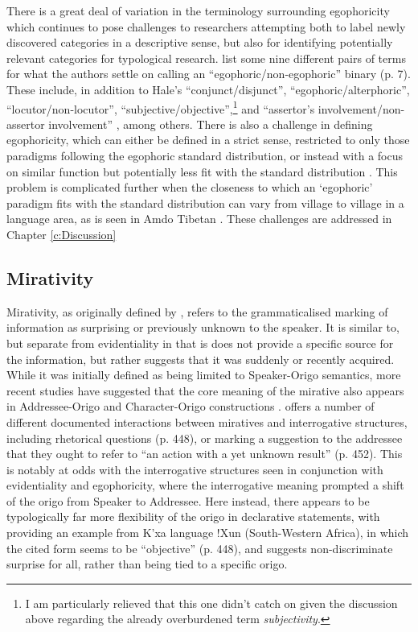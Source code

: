 There is a great deal of variation in the terminology surrounding egophoricity which continues to pose challenges to researchers attempting both to label newly discovered categories in a descriptive sense, but also for identifying potentially relevant categories for typological research.  list some nine different pairs of terms for what the authors settle on calling an ``egophoric/non-egophoric'' binary (p. 7). These include, in addition to Hale's ``conjunct/disjunct'', ``egophoric/alterphoric'', ``locutor/non-locutor'', ``subjective/objective'',\footnote{I am particularly relieved that this one didn't catch on given the discussion above regarding the already overburdened term \textit{subjectivity}.} and ``assertor's involvement/non-assertor involvement'' \cite[8]{EgoIntro}, among others. There is also a challenge in defining egophoricity, which can either be defined in a strict sense, restricted to only those paradigms following the egophoric standard distribution, or instead with a focus on similar function but potentially less fit with the standard distribution \cite{EgoIntro}. This problem is complicated further when the closeness to which an `egophoric' paradigm fits with the standard distribution can vary from village to village in a language area, as is seen in Amdo Tibetan \cite{Tribur2019}. These challenges are addressed in Chapter \ref{c:Discussion} 

\subsection{Mirativity}\label{s:Intro:MirativityIntro}
Mirativity, as originally defined by , refers to the grammaticalised marking of information as surprising or previously unknown to the speaker. It is similar to, but separate from evidentiality in that is does not provide a specific source for the information, but rather suggests that it was suddenly or recently acquired. While it was initially defined as being limited to Speaker-Origo semantics, more recent studies have suggested that the core meaning of the mirative also appears in Addressee-Origo and Character-Origo constructions \cites{HengeveldOlbertz2012}{Aikhenvald2012Mirative}.  offers a number of different documented interactions between miratives and interrogative structures, including rhetorical questions (p. 448), or marking a suggestion to the addressee that they ought to refer to ``an action with a yet unknown result'' (p. 452). This is notably at odds with the interrogative structures seen in conjunction with evidentiality and egophoricity, where the interrogative meaning prompted a shift of the origo from Speaker to Addressee. Here instead, there appears to be typologically far more flexibility of the origo in declarative statements, with  providing an example from K'xa language \mbox{!Xun} (South-Western Africa), in which the cited form seems to be ``objective'' (p. 448), and suggests non-discriminate surprise for all, rather than being tied to a specific origo.

